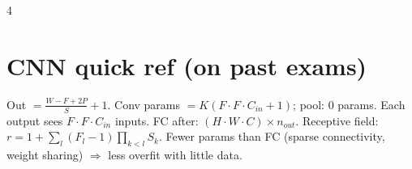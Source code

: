 \documentclass[8pt,landscape]{extarticle}
\begin{document}
\begin{multicols*}{4}
\section{CNN quick ref (on past exams)}
Out $=\frac{W-F+2P}{S}+1$. Conv params $=K(F\cdot F\cdot C_{in}+1)$; pool: 0 params. Each output sees $F\!\cdot\!F\!\cdot\!C_{in}$ inputs. FC after: $(H\!\cdot\!W\!\cdot\!C)\times n_{out}$. Receptive field: $r=1+\sum_l(F_l-1)\prod_{k<l}S_k$. Fewer params than FC (sparse connectivity, weight sharing) $\Rightarrow$ less overfit with little data.

\end{multicols*}
\end{document}
